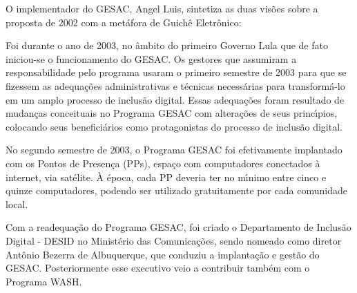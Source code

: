 \documentclass[
12pt,		%
openright,	%
twoside,  %
a4paper,			%
chapter=TITLE,		%
english,			%
french,				%
spanish,			%
brazil				%
]{USPSC-classe/USPSC}
\begin{document}
O implementador do GESAC, Angel Luis, sintetiza as duas vis\~oes sobre a proposta de 2002 com a met\'afora de \textquotedbl Guich\^e Eletr\^onico\textquotedbl :









\noindent\begin{center}\mbox{\centering{}}\end{center}


Foi durante o ano de 2003, no \^ambito do primeiro Governo Lula que de fato iniciou-se o funcionamento do  GESAC. Os gestores que assumiram a responsabilidade pelo programa usaram o primeiro semestre de 2003 para que se fizessem as adequa\c{c}\~oes administrativas e t\'ecnicas necess\'arias para transform\'a-lo em um amplo processo de inclus\~ao digital. Essas adequa\c{c}\~oes foram resultado de mudan\c{c}as conceituais no Programa GESAC com altera\c{c}\~oes de seus princ\'{\i}pios, colocando seus benefici\'arios como protagonistas do processo de inclus\~ao digital.








No segundo semestre de 2003, o Programa GESAC foi efetivamente implantado com os Pontos de Presen\c{c}a (PPs), espa\c{c}o com  computadores conectados \`a internet, via sat\'elite. \`A \'epoca, cada PP deveria ter no m\'{\i}nimo entre cinco e quinze computadores, podendo ser utilizado gratuitamente por cada comunidade local.








Com a readequa\c{c}\~ao do Programa GESAC, foi criado o Departamento de Inclus\~ao Digital - DESID no Minist\'erio das Comunica\c{c}\~oes, sendo nomeado como diretor Ant\^onio Bezerra de Albuquerque, que conduziu a implanta\c{c}\~ao e gest\~ao do GESAC. Posteriormente esse executivo veio a contribuir tamb\'em com o Programa WASH.
\end{document}
